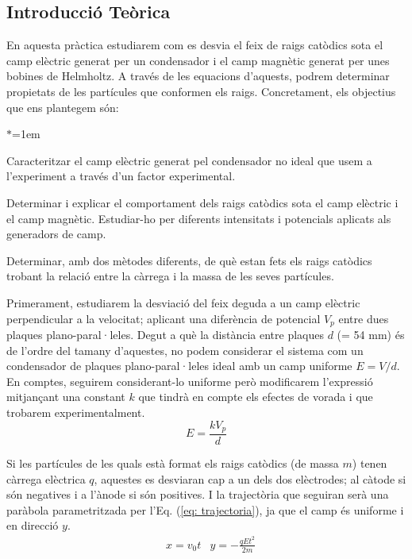 \documentclass[11pt]{article}
\numberwithin{equation}{section}
\numberwithin{figure}{section}
\numberwithin{table}{section}
\begin{document}
\subsection{Introducció Teòrica}
En aquesta pràctica estudiarem com es desvia el feix de raigs catòdics sota el camp elèctric generat per un condensador i el camp magnètic generat per unes bobines de Helmholtz. A través de les equacions d'aquests, podrem determinar propietats de les partícules que conformen els raigs. Concretament, els objectius que ens plantegem són:

\begin{list}{$\ast$}{\leftmargin=1em}
    \item Caracteritzar el camp elèctric generat pel condensador no ideal que usem a l'experiment a través d'un factor experimental.
    \item Determinar i explicar el comportament dels raigs catòdics sota el camp elèctric i el camp magnètic. Estudiar-ho per diferents intensitats i potencials aplicats als generadors de camp.
    \item Determinar, amb dos mètodes diferents, de què estan fets els raigs catòdics trobant la relació entre la càrrega i la massa de les seves partícules.
\end{list}


Primerament, estudiarem la desviació del feix deguda a un camp elèctric perpendicular a la velocitat; aplicant una diferència de potencial $V_p$ entre dues plaques plano-paral·leles. Degut a què la distància entre plaques $d$ (= 54 mm) és de l'ordre del tamany d'aquestes, no podem considerar el sistema com un condensador de plaques plano-paral·leles ideal amb un camp uniforme $E=V/d$. En comptes, seguirem considerant-lo uniforme però modificarem l'expressió mitjançant una constant $k$ que tindrà en compte els efectes de vorada i que trobarem experimentalment.
\begin{equation}
    E = \frac{kV_p}{d}
    \label{eq: Camp E}
\end{equation}

Si les partícules de les quals està format els raigs catòdics (de massa $m$) tenen càrrega elèctrica $q$, aquestes es desviaran cap a un dels dos elèctrodes; al càtode si són negatives i a l'ànode si són positives. I la trajectòria que seguiran serà una paràbola parametritzada per l'Eq. (\ref{eq: trajectoria}), ja que el camp és uniforme i en direcció $y$.
\begin{align}    \label{eq: trajectoria}
    &x = v_0 t      &y = -\frac{qEt^2}{2m}
\end{align}
\end{document}
